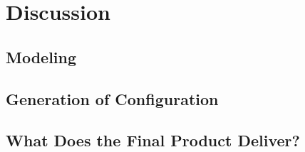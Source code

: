 \chapter{Discussion}\label{ch:discussion}

\section{Modeling}\label{sec:modeling}


\section{Generation of Configuration}

\section{What Does the Final Product Deliver?}